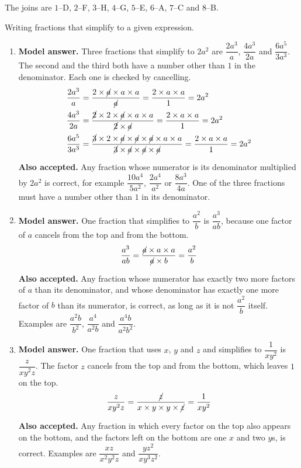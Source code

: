 \documentclass[12pt,a4paper]{article}
\newcommand{\qhead}[2]{\par\addvspace{9pt}%
  \noindent{\bfseries Q#1.}\enspace #2\par\nobreak}
\newcommand{\modelans}{\par\smallskip
  \noindent\textbf{\color{blue!50!black}Model answer.}\space}
\newcommand{\alsoacc}{\par\smallskip
  \noindent\textbf{\color{blue!50!black}Also accepted.}\space}
\begin{document}
\vspace{4pt}
The joins are $1$--D, $2$--F, $3$--H, $4$--G, $5$--E, $6$--A, $7$--C and
$8$--B.

\newpage

\qhead{8}{Writing fractions that simplify to a given expression.}
\begin{enumerate}
\item
\modelans
Three fractions that simplify to $2a^2$ are $\dfrac{2a^3}{a}$, \;
$\dfrac{4a^3}{2a}$ \; and \; $\dfrac{6a^5}{3a^3}$. The second and the third
both have a number other than $1$ in the denominator. Each one is checked by
cancelling.
\begin{align*}
\frac{2a^3}{a}&=\frac{2\times\cancel{a}\times a\times a}{\cancel{a}}
  =\frac{2\times a\times a}{1}=2a^2\\[2pt]
\frac{4a^3}{2a}&=\frac{\cancel{2}\times2\times\cancel{a}\times a\times a}
  {\cancel{2}\times\cancel{a}}=\frac{2\times a\times a}{1}=2a^2\\[2pt]
\frac{6a^5}{3a^3}&=\frac{\cancel{3}\times2\times\cancel{a}\times\cancel{a}
  \times\cancel{a}\times a\times a}
  {\cancel{3}\times\cancel{a}\times\cancel{a}\times\cancel{a}}
  =\frac{2\times a\times a}{1}=2a^2
\end{align*}
\alsoacc
Any fraction whose numerator is its denominator multiplied by $2a^2$ is
correct, for example $\dfrac{10a^4}{5a^2}$, $\dfrac{2a^4}{a^2}$ or
$\dfrac{8a^3}{4a}$. One of the three fractions must have a number other than
$1$ in its denominator.

\item
\modelans
One fraction that simplifies to $\dfrac{a^2}{b}$ is $\dfrac{a^3}{ab}$, because
one factor of $a$ cancels from the top and from the bottom.
\[\frac{a^3}{ab}
  =\frac{\cancel{a}\times a\times a}{\cancel{a}\times b}=\frac{a^2}{b}\]
\alsoacc
Any fraction whose numerator has exactly two more factors of $a$ than its
denominator, and whose denominator has exactly one more factor of $b$ than its
numerator, is correct, as long as it is not $\dfrac{a^2}{b}$ itself. Examples are $\dfrac{a^2b}{b^2}$, $\dfrac{a^4}{a^2b}$
and $\dfrac{a^4b}{a^2b^2}$.

\item
\modelans
One fraction that uses $x$, $y$ and $z$ and simplifies to $\dfrac{1}{xy^2}$ is
$\dfrac{z}{xy^2z}$. The factor $z$ cancels from the top and from the bottom,
which leaves $1$ on the top.
\[\frac{z}{xy^2z}=\frac{\cancel{z}}{x\times y\times y\times\cancel{z}}
  =\frac{1}{xy^2}\]
\alsoacc
Any fraction in which every factor on the top also appears on the bottom, and
the factors left on the bottom are one $x$ and two $y$s, is correct. Examples
are $\dfrac{xz}{x^2y^2z}$ and $\dfrac{yz^2}{xy^3z^2}$.


\end{enumerate}
\end{document}
